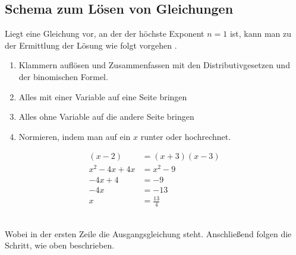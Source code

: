 \subsection{Schema zum Lösen von Gleichungen}\label{sec:Gleichungen/Schema zum Loesen von Gleichungen}
Liegt eine Gleichung vor, an der der höchste Exponent $n=$$1$ ist, kann man zu der Ermittlung der Lösung wie folgt vorgehen . 
\begin{enumerate}
	\item Klammern auflösen und Zusammenfassen mit den Distributivgesetzen und der binomischen Formel.
	\item Alles mit einer Variable auf eine Seite bringen
	\item Alles ohne Variable auf die andere Seite bringen
	\item Normieren, indem man auf ein $x$ runter oder hochrechnet. 
\end{enumerate}
\setcounter{equation}{0}

\begin{beispiel}
	\begin{align*}
		(x-2)&=(x+3)(x-3)\\
		x^2-4x+4x&=x^2-9\\
		-4x+4 &= -9\\
		-4x&=-13\\
		x&=\frac{13}{4}
	\end{align*}
\end{beispiel}\\
Wobei in der ersten Zeile die Ausgangsgleichung steht. Anschließend folgen die Schritt, wie oben beschrieben. 